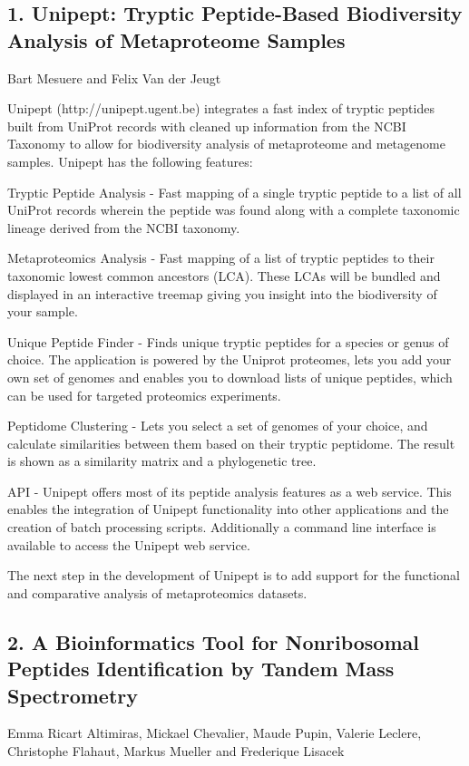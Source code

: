 
\subsection*{\color{eubicRed} 1. Unipept: Tryptic Peptide-Based Biodiversity Analysis of Metaproteome Samples }
{\color{eubicGray}Bart Mesuere and Felix Van der Jeugt}

Unipept (http://unipept.ugent.be) integrates a fast index of tryptic peptides built from UniProt records with cleaned up information from the NCBI Taxonomy to allow for biodiversity analysis of metaproteome and metagenome samples. Unipept has the following features:

Tryptic Peptide Analysis - Fast mapping of a single tryptic peptide to a list of all UniProt records wherein the peptide was found along with a complete taxonomic lineage derived from the NCBI taxonomy.

Metaproteomics Analysis - Fast mapping of a list of tryptic peptides to their taxonomic lowest common ancestors (LCA). These LCAs will be bundled and displayed in an interactive treemap giving you insight into the biodiversity of your sample.

Unique Peptide Finder - Finds unique tryptic peptides for a species or genus of choice. The application is powered by the Uniprot proteomes, lets you add your own set of genomes and enables you to download lists of unique peptides, which can be used for targeted proteomics experiments.

Peptidome Clustering - Lets you select a set of genomes of your choice, and calculate similarities between them based on their tryptic peptidome. The result is shown as a similarity matrix and a phylogenetic tree.

API - Unipept offers most of its peptide analysis features as a web service. This enables the integration of Unipept functionality into other applications and the creation of batch processing scripts. Additionally a command line interface is available to access the Unipept web service.

The next step in the development of Unipept is to add support for the functional and comparative analysis of metaproteomics datasets.


\subsection*{\color{eubicRed} 2. A Bioinformatics Tool for Nonribosomal Peptides Identification by Tandem Mass Spectrometry}
{\color{eubicGray}Emma Ricart Altimiras, Mickael Chevalier, Maude Pupin, Valerie Leclere, Christophe Flahaut, Markus Mueller and Frederique Lisacek}

